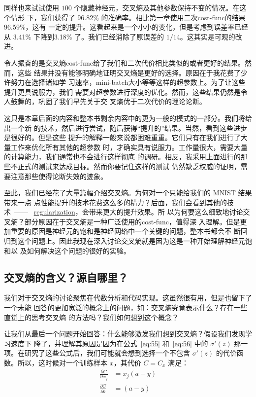 同样也来试试使用 $100$ 个隐藏神经元，交叉熵及其他参数保持不变的情况。在这个情形
下，我们获得了 96.82\% 的准确率。相比第一章使用二次\gls*{cost-func}的结果 96.59\%，这有
一定的提升。这看起来是一个小小的变化，但是考虑到误差率已经从 3.41\% 下降到3.18\%
了。我们已经消除了原误差的 $1/14$。这其实是可观的改进。

令人振奋的是交叉熵\gls*{cost-func}给了我们和二次代价相比类似的或者更好的结果。然而，这些
结果并没有能够明确地证明交叉熵是更好的选择。原因在于我花费了少许努力在选择诸如学
习速率，\gls*{mini-batch}大小等等这样的超参数上。为了让这些提升更具说服力，我们
需要对超参数进行深度的优化。然而，这些结果仍然是令人鼓舞的，巩固了我们早先关于交
叉熵优于二次代价的理论论断。

这只是本章后面的内容和整本书剩余内容中的更为一般的模式的一部分。我们将给出一个新
的技术，然后进行尝试，随后获得“提升的”结果。当然，看到这些进步是很好的。但是这些
提升的解释一般来说都困难重重。它们只有在我们进行了大量工作来优化所有其他的超参数
时，才确实具有说服力。工作量很大，需要大量的计算能力，我们通常也不会进行这样彻底
的调研。相反，我采用上面进行的那些不正式的测试来达成目标。然而你要记住这样的测试
仍然缺乏权威的证明，需要注意那些使得论断失效的迹象。

至此，我们已经花了大量篇幅介绍交叉熵。为何对一个只能给我们的 MNIST 结果带来一点
点性能提升的技术花费这么多的精力？后面，我们会看到其他的技术~——~%
\hyperref[sec:overfitting_and_regularization]{\gls*{regularization}}，会带来更大的提升效果。所
以为何要这么细致地讨论交叉熵？部分原因在于交叉熵是一种广泛使用的\gls*{cost-func}，值得深
入理解。但是更加重要的原因是神经元的饱和是神经网络中一个关键的问题，整本书都会不
断回归到这个问题上。因此我现在深入讨论交叉熵就是因为这是一种开始理解神经元饱和以
及如何解决这个问题的很好的实验。

\subsection{交叉熵的含义？源自哪里？}

我们对于交叉熵的讨论聚焦在代数分析和代码实现。这虽然很有用，但是也留下了一个未能
回答的更加宽泛的概念上的问题，如：交叉熵究竟表示什么？存在一些直觉上的思考交叉熵
的方法吗？我们如何想到这个概念？

让我们从最后一个问题开始回答：什么能够激发我们想到交叉熵？假设我们发现学习速度下
降了，并理解其原因是因为在公式~\eqref{eq:55} 和~\eqref{eq:56} 中的 $\sigma'(z)$
那一项。在研究了这些公式后，我们可能就会想到选择一个不包含 $\sigma'(z)$ 的代价函
数。所以，这时候对一个训练样本 $x$，其代价 $C = C_x$ 满足：
\begin{align}
  \frac{\partial C}{\partial w_j} &= x_j(a-y) \label{eq:71}\tag{71}\\
  \frac{\partial C}{\partial b } &= (a-y) \label{eq:72}\tag{72}
\end{align}

